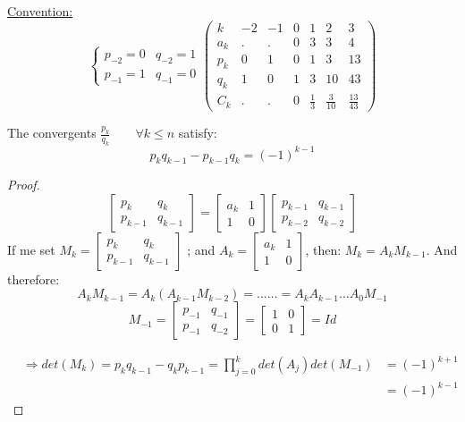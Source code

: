 \documentclass{report}
\begin{document}
\underline{Convention:}
											\[\left \{
												\begin{array}{lcl}
												p_{-2}=0&q_{-2}=1\\
												p_{-1}=1&q_{-1}=0
												\end{array}
												\right.
												\left(
												\begin{array}{l|l|l|l|l|l|l}
												k&-2&-1&0&1&2&3\\ \hline
												a_k&.&.&0&3&3&4\\
												p_k&0&1&0&1&3&13\\
												q_k&1&0&1&3&10&43\\
												C_k&.&.&0&\frac{1}{3}&\frac{3}{10}&\frac{13}{43}
												\end{array}
												\right)
											\]
\begin{thm}The convergents $\frac{p_k}{q_k}\qquad \scriptstyle{\forall k\leq n}$ satisfy:\[p_kq_{k-1}-p_{k-1}q_k=(-1)^{k-1}\]
\end{thm}
\begin{proof} \[
							\begin{bmatrix}
								p_k & q_k\\
								p_{k-1}& q_{k-1}
							\end{bmatrix}
							=
							\begin{bmatrix}
								a_k&1\\
								1&0
							\end{bmatrix}
							\begin{bmatrix}
								p_{k-1}&q_{k-1}\\
								p_{k-2}&q_{k-2}
							\end{bmatrix}
							\]
							If me set $M_k=\begin{bmatrix}
															p_k&q_k\\
															p_{k-1}&q_{k-1}
															\end{bmatrix}$
															; and $A_k=
															\begin{bmatrix}
																a_k&1\\
																1&0
															\end{bmatrix}$, then: $M_k=A_kM_{k-1}$.	
And therefore: \[A_kM_{k-1}=A_k(A_{k-1}M_{k-2})=\dots\dots=A_kA_{k-1}\dots A_0M_{-1}\]
								\[M_{-1}=\begin{bmatrix}
													p_{-1}&q_{-1}\\
													p_{-1}&q_{-2}
													\end{bmatrix}
													=
													\begin{bmatrix}
													1&0\\
													0&1
													\end{bmatrix}
									=Id\]
													
								\[\begin{array}{lcl}
								&\Rightarrow det(M_k)=p_kq_{k-1}-q_kp_{k-1}=\prod_{j=0}^{k} det(A_j)det(M_{-1})&	=(-1)^{k+1}\\
																																															&&	=(-1)^{k-1}
																																																\end{array}\]
\end{proof}
\end{document}
